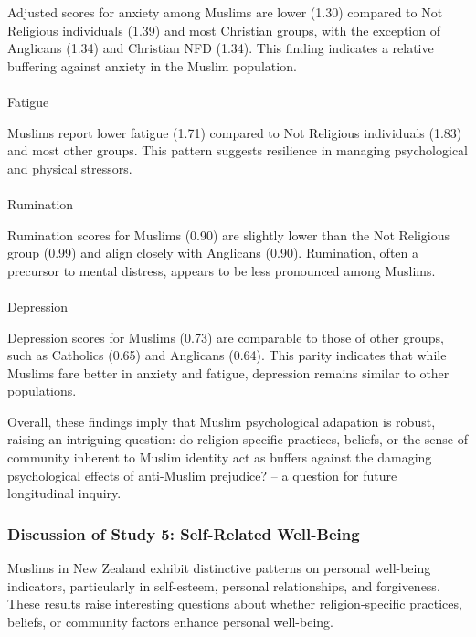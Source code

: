 \documentclass[
  single column]{article}
\makeatletter
\let\oldparagraph\paragraph
\renewcommand{\paragraph}{
    \@ifstar
      \xxxParagraphStar
      \xxxParagraphNoStar
  }
\newcommand{\xxxParagraphStar}[1]{\oldparagraph*{#1}\mbox{}}
\newcommand{\xxxParagraphNoStar}[1]{\oldparagraph{#1}\mbox{}}
\makeatother
\begin{document}
Adjusted scores for anxiety among Muslims are lower (1.30) compared to
Not Religious individuals (1.39) and most Christian groups, with the
exception of Anglicans (1.34) and Christian NFD (1.34). This finding
indicates a relative buffering against anxiety in the Muslim population.

\paragraph{Fatigue}\label{fatigue}

Muslims report lower fatigue (1.71) compared to Not Religious
individuals (1.83) and most other groups. This pattern suggests
resilience in managing psychological and physical stressors.

\paragraph{Rumination}\label{rumination}

Rumination scores for Muslims (0.90) are slightly lower than the Not
Religious group (0.99) and align closely with Anglicans (0.90).
Rumination, often a precursor to mental distress, appears to be less
pronounced among Muslims.

\paragraph{Depression}\label{depression}

Depression scores for Muslims (0.73) are comparable to those of other
groups, such as Catholics (0.65) and Anglicans (0.64). This parity
indicates that while Muslims fare better in anxiety and fatigue,
depression remains similar to other populations.

Overall, these findings imply that Muslim psychological adapation is
robust, raising an intriguing question: do religion-specific practices,
beliefs, or the sense of community inherent to Muslim identity act as
buffers against the damaging psychological effects of anti-Muslim
prejudice? -- a question for future longitudinal inquiry.

\subsubsection{Discussion of Study 5: Self-Related
Well-Being}\label{discussion-of-study-5-self-related-well-being}

Muslims in New Zealand exhibit distinctive patterns on personal
well-being indicators, particularly in self-esteem, personal
relationships, and forgiveness. These results raise interesting
questions about whether religion-specific practices, beliefs, or
community factors enhance personal well-being.
\end{document}
